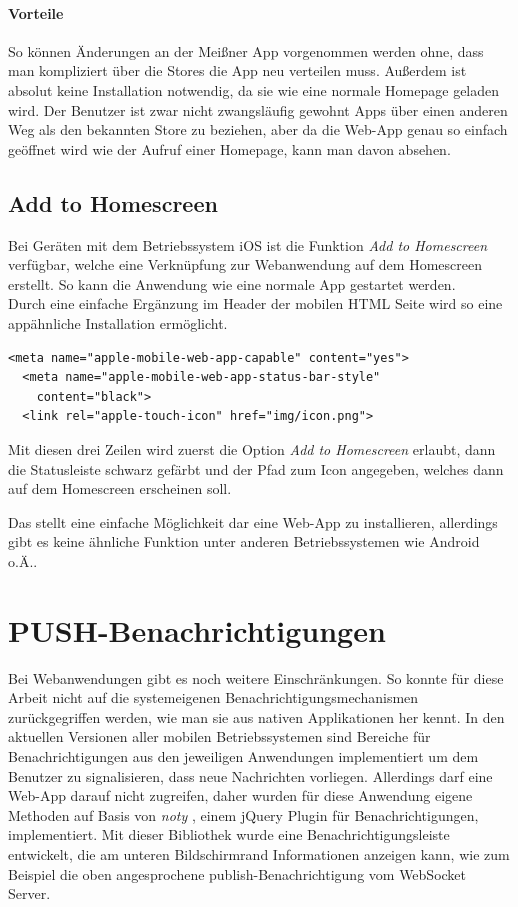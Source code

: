 \paragraph{Vorteile}
So können Änderungen an der Meißner App vorgenommen werden ohne, dass man kompliziert über die Stores die App neu verteilen muss. Außerdem ist absolut keine Installation notwendig, da sie wie eine normale Homepage geladen wird. Der Benutzer ist zwar nicht zwangsläufig gewohnt Apps über einen anderen Weg als den bekannten Store zu beziehen, aber da die Web-App genau so einfach geöffnet wird wie der Aufruf einer Homepage, kann man davon absehen.

\subsection{Add to Homescreen}
Bei Geräten mit dem Betriebssystem iOS ist die Funktion \emph{Add to Homescreen} verfügbar, welche eine Verknüpfung zur Webanwendung auf dem Homescreen erstellt. So kann die Anwendung wie eine normale App gestartet werden.\\
Durch eine einfache Ergänzung im Header der mobilen HTML Seite wird so eine appähnliche Installation ermöglicht.
\\
\begin{lstlisting}[captionpos=b, caption=Ergänzung im Header der mobilen Seite]
  <meta name="apple-mobile-web-app-capable" content="yes">
  <meta name="apple-mobile-web-app-status-bar-style"
  	content="black">
  <link rel="apple-touch-icon" href="img/icon.png">
\end{lstlisting}
Mit diesen drei Zeilen wird zuerst die Option \emph{Add to Homescreen} erlaubt, dann die Statusleiste schwarz gefärbt und der Pfad zum Icon angegeben, welches dann auf dem Homescreen erscheinen soll.\par

Das stellt eine einfache Möglichkeit dar eine Web-App zu installieren, allerdings gibt es keine ähnliche Funktion unter anderen Betriebssystemen wie Android o.Ä..


\section{PUSH-Benachrichtigungen}
Bei Webanwendungen gibt es noch weitere Einschränkungen. So konnte für diese Arbeit nicht auf die systemeigenen Benachrichtigungsmechanismen zurückgegriffen werden, wie man sie aus nativen Applikationen her kennt. In den aktuellen Versionen aller mobilen Betriebssystemen sind Bereiche für Benachrichtigungen aus den jeweiligen Anwendungen implementiert um dem Benutzer zu signalisieren, dass neue Nachrichten vorliegen. Allerdings darf eine Web-App darauf nicht zugreifen, daher wurden für diese Anwendung eigene Methoden auf Basis von \emph{noty} \cite{noty}, einem jQuery Plugin für Benachrichtigungen, implementiert. Mit dieser Bibliothek wurde eine Benachrichtigungsleiste entwickelt, die am unteren Bildschirmrand Informationen anzeigen kann, wie zum Beispiel die oben angesprochene publish-Benachrichtigung vom WebSocket Server.\par

